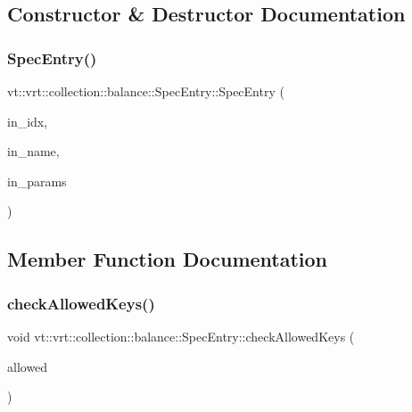 \subsection{Constructor \& Destructor Documentation}
\mbox{\label{structvt_1_1vrt_1_1collection_1_1balance_1_1_spec_entry_a69de4799079a46b5af62eccf974b7eef}} 
\subsubsection{\texorpdfstring{Spec\+Entry()}{SpecEntry()}}
{\footnotesize\ttfamily vt\+::vrt\+::collection\+::balance\+::\+Spec\+Entry\+::\+Spec\+Entry (\begin{DoxyParamCaption}\item[{\hyperlink{namespacevt_1_1vrt_1_1collection_1_1balance_a72a5e0d9936ddf57f8e6c64e0e9fd123}{Spec\+Index} const}]{in\+\_\+idx,  }\item[{std\+::string const}]{in\+\_\+name,  }\item[{std\+::unordered\+\_\+map$<$ std\+::string, std\+::string $>$}]{in\+\_\+params }\end{DoxyParamCaption})\hspace{0.3cm}{\ttfamily [inline]}}



\subsection{Member Function Documentation}
\mbox{\label{structvt_1_1vrt_1_1collection_1_1balance_1_1_spec_entry_a86ea05b64615f7be99e8db3baf195aae}} 
\subsubsection{\texorpdfstring{check\+Allowed\+Keys()}{checkAllowedKeys()}}
{\footnotesize\ttfamily void vt\+::vrt\+::collection\+::balance\+::\+Spec\+Entry\+::check\+Allowed\+Keys (\begin{DoxyParamCaption}\item[{std\+::vector$<$ std\+::string $>$ const \&}]{allowed }\end{DoxyParamCaption})\hspace{0.3cm}{\ttfamily [inline]}}

